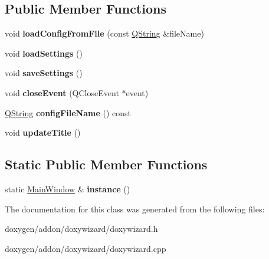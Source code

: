 \subsection*{Public Member Functions}
\begin{DoxyCompactItemize}
\item 
\mbox{\label{class_main_window_ac37794b59b8bf73f92c45900ea37784b}} 
void {\bfseries load\+Config\+From\+File} (const \mbox{\hyperlink{class_q_string}{Q\+String}} \&file\+Name)
\item 
\mbox{\label{class_main_window_a9bb1f3b7f6b5360abfd2dc01fc1c8930}} 
void {\bfseries load\+Settings} ()
\item 
\mbox{\label{class_main_window_abb30531afee763d0586ee6323fd332e2}} 
void {\bfseries save\+Settings} ()
\item 
\mbox{\label{class_main_window_a4e20a4a065fbb0e4d3532a45a0a91425}} 
void {\bfseries close\+Event} (Q\+Close\+Event $\ast$event)
\item 
\mbox{\label{class_main_window_a837aafa5646e2d45eada057b5bf144a0}} 
\mbox{\hyperlink{class_q_string}{Q\+String}} {\bfseries config\+File\+Name} () const
\item 
\mbox{\label{class_main_window_ac62839f0a6f642f68f06729f351893e3}} 
void {\bfseries update\+Title} ()
\end{DoxyCompactItemize}
\subsection*{Static Public Member Functions}
\begin{DoxyCompactItemize}
\item 
\mbox{\label{class_main_window_aa263665dfb2a4b91a6d97c2546fca227}} 
static \mbox{\hyperlink{class_main_window}{Main\+Window}} \& {\bfseries instance} ()
\end{DoxyCompactItemize}


The documentation for this class was generated from the following files\+:\begin{DoxyCompactItemize}
\item 
doxygen/addon/doxywizard/doxywizard.\+h\item 
doxygen/addon/doxywizard/doxywizard.\+cpp\end{DoxyCompactItemize}
